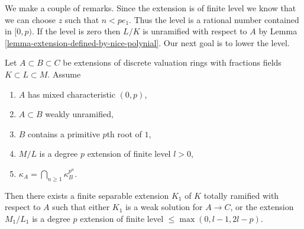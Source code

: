 \medskip\noindent
We make a couple of remarks. Since the extension is of finite level
we know that we can choose $z$ such that $n < pe_1$.
Thus the level is a rational number contained in $[0, p)$.
If the level is zero then $L/K$ is unramified with respect to $A$ by
Lemma \ref{lemma-extension-defined-by-nice-polynial}.
Our next goal is to lower the level.

\begin{lemma}
\label{lemma-lowering-the-level}
Let $A \subset B \subset C$ be extensions of discrete valuation rings
with fractions fields $K \subset L \subset M$. Assume
\begin{enumerate}
\item $A$ has mixed characteristic $(0, p)$,
\item $A \subset B$ weakly unramified,
\item $B$ contains a primitive $p$th root of $1$,
\item $M/L$ is a degree $p$ extension of finite level $l > 0$,
\item $\kappa_A = \bigcap_{n \geq 1} \kappa_B^{p^n}$.
\end{enumerate}
Then there exists a finite separable extension $K_1$ of $K$
totally ramified with respect to $A$
such that either $K_1$ is a weak solution for $A \to C$, or the extension
$M_1/L_1$ is a degree $p$ extension of finite level
$\leq \max(0, l - 1, 2l - p)$.
\end{lemma}


